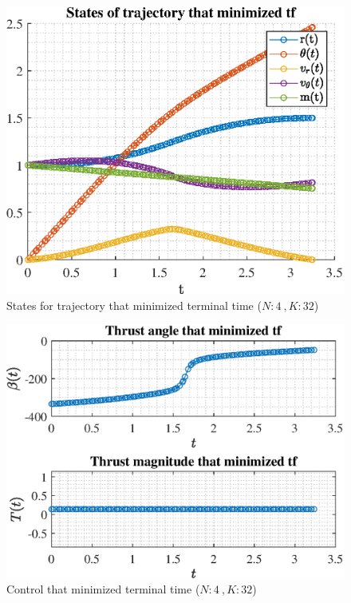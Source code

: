 \documentclass[]{article}
\begin{document}
	\begin{figure}
		\centering
		\includegraphics[scale=0.75]{states_N4_K32_C2_tf.eps}
		\caption{States for trajectory that minimized terminal time (\(N:4\ , K:32\))}
		\label{fig:states_N4_K32_C2_tf}
	\end{figure}
	\begin{figure}
		\centering
		\includegraphics[scale=0.75]{control_N4_K32_C2_tf.eps}
		\caption{Control that minimized terminal time (\(N:4\ , K:32\))}
		\label{fig:control_N4_K32_C2_tf}
	\end{figure}
\end{document}
